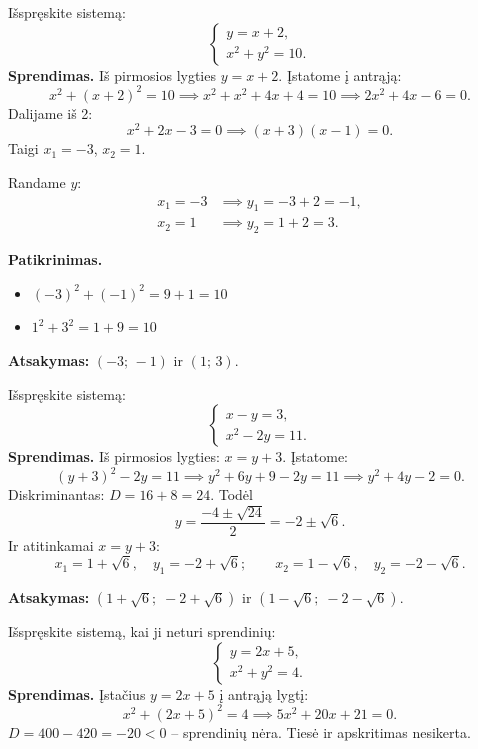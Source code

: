 \begin{example}
Išspręskite sistemą:
\[
  \begin{cases}
    y = x + 2,\\
    x^2 + y^2 = 10.
  \end{cases}
\]
\textbf{Sprendimas.} Iš pirmosios lygties $y = x+2$. Įstatome į antrąją:
\[
  x^2 + (x+2)^2 = 10 \implies x^2 + x^2 + 4x + 4 = 10 \implies 2x^2 + 4x - 6 = 0.
\]
Dalijame iš 2:
\[
  x^2 + 2x - 3 = 0 \implies (x+3)(x-1) = 0.
\]
Taigi $x_1 = -3$, $x_2 = 1$.

Randame $y$:
\begin{align*}
  x_1 = -3 &\implies y_1 = -3 + 2 = -1,\\
  x_2 = 1  &\implies y_2 = 1 + 2 = 3.
\end{align*}

\textbf{Patikrinimas.}
\begin{itemize}
  \item $(-3)^2 + (-1)^2 = 9 + 1 = 10$ \checkmark
  \item $1^2 + 3^2 = 1 + 9 = 10$ \checkmark
\end{itemize}

\textbf{Atsakymas:} $(-3;\,-1)$ ir $(1;\,3)$.
\end{example}

\begin{example}
Išspręskite sistemą:
\[
  \begin{cases}
    x - y = 3,\\
    x^2 - 2y = 11.
  \end{cases}
\]
\textbf{Sprendimas.} Iš pirmosios lygties: $x = y + 3$. Įstatome:
\[
  (y+3)^2 - 2y = 11 \implies y^2 + 6y + 9 - 2y = 11 \implies y^2 + 4y - 2 = 0.
\]
Diskriminantas: $D = 16 + 8 = 24$. Todėl
\[
  y = \frac{-4 \pm \sqrt{24}}{2} = -2 \pm \sqrt{6}.
\]
Ir atitinkamai $x = y + 3$:
\[
  x_1 = 1 + \sqrt{6},\quad y_1 = -2 + \sqrt{6};\qquad x_2 = 1 - \sqrt{6},\quad y_2 = -2 - \sqrt{6}.
\]

\textbf{Atsakymas:} $(1+\sqrt{6};\; -2+\sqrt{6})$ ir $(1-\sqrt{6};\; -2-\sqrt{6})$.
\end{example}

\begin{example}
Išspręskite sistemą, kai ji neturi sprendinių:
\[
  \begin{cases}
    y = 2x + 5,\\
    x^2 + y^2 = 4.
  \end{cases}
\]
\textbf{Sprendimas.} Įstačius $y = 2x+5$ į antrąją lygtį:
\[
  x^2 + (2x+5)^2 = 4 \implies 5x^2 + 20x + 21 = 0.
\]
$D = 400 - 420 = -20 < 0$ -- sprendinių nėra. Tiesė ir apskritimas nesikerta.
\end{example}

